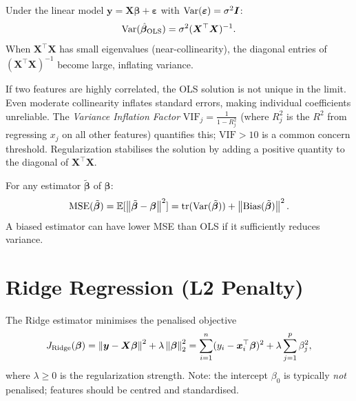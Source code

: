 \begin{proposition}
Under the linear model $\bm{y} = \bm{X}\bm{\beta} + \bm{\varepsilon}$ with $\mathrm{Var}(\bm{\varepsilon}) = \sigma^2\bm{I}$:
\[
    \mathrm{Var}(\hat{\bm{\beta}}_{\text{OLS}}) = \sigma^2(\bm{X}^\top\bm{X})^{-1}.
\]
When $\bm{X}^\top\bm{X}$ has small eigenvalues (near-collinearity), the diagonal entries of $(\bm{X}^\top\bm{X})^{-1}$ become large, inflating variance.
\end{proposition}

\begin{warning}[title=\textbf{Multicollinearity}]
If two features are highly correlated, the OLS solution is not unique in the limit. Even moderate collinearity inflates standard errors, making individual coefficients unreliable. The \emph{Variance Inflation Factor} $\text{VIF}_j = \frac{1}{1-R_j^2}$ (where $R_j^2$ is the $R^2$ from regressing $x_j$ on all other features) quantifies this; $\text{VIF} > 10$ is a common concern threshold. Regularization stabilises the solution by adding a positive quantity to the diagonal of $\bm{X}^\top\bm{X}$.
\end{warning}

\begin{proposition}
For any estimator $\tilde{\bm{\beta}}$ of $\bm{\beta}$:
\[
    \text{MSE}(\tilde{\bm{\beta}}) = \mathbb{E}[\left\| \tilde{\bm{\beta}}-\bm{\beta} \right\|^2]
    = \text{tr}(\mathrm{Var}(\tilde{\bm{\beta}})) + \left\| \mathrm{Bias}(\tilde{\bm{\beta}}) \right\|^2.
\]
A biased estimator can have lower MSE than OLS if it sufficiently reduces variance.
\end{proposition}

\section{Ridge Regression (L2 Penalty)}

\begin{definition}
The Ridge estimator minimises the penalised objective
\[
    J_{\text{Ridge}}(\bm{\beta})
    = \left\| \bm{y} - \bm{X}\bm{\beta} \right\|^2 + \lambda\left\| \bm{\beta} \right\|^2_2
    = \sum_{i=1}^{n}(y_i - \bm{x}_i^\top\bm{\beta})^2 + \lambda\sum_{j=1}^{p}\beta_j^2,
\]
where $\lambda \geq 0$ is the regularization strength. Note: the intercept $\beta_0$ is typically \emph{not} penalised; features should be centred and standardised.
\end{definition}

